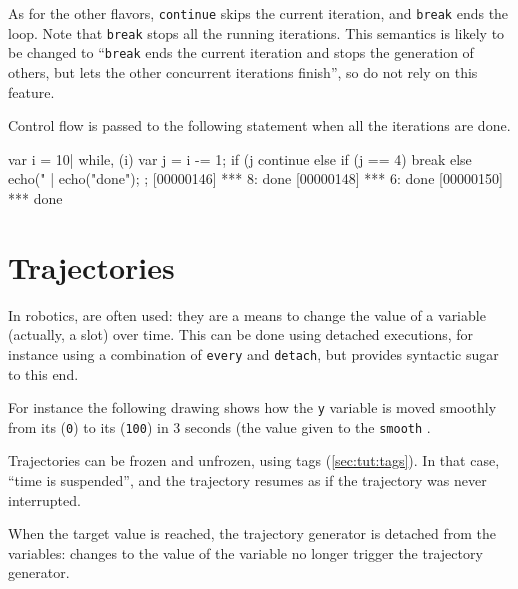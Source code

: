 As for the other flavors, \lstinline|continue| skips the current
iteration, and \lstinline|break| ends the loop.  Note that
\lstinline|break| stops all the running iterations.  This semantics is
likely to be changed to ``\lstinline|break| ends the current iteration
and stops the generation of others, but lets the other concurrent
iterations finish'', so do not rely on this feature.

Control flow is passed to the following statement when all the
iterations are done.

\begin{urbiscript}
{
  var i = 10|
  while, (i)
  {
    var j = i -= 1;
    if (j %
      continue
    else if (j == 4)
      break
    else
      echo("%
  }|
  echo("done");
};
[00000146] *** 8: done
[00000148] *** 6: done
[00000150] *** done
\end{urbiscript}



\section{Trajectories}
\label{sec:lang:traj}

In robotics,  are often used: they are a
means to change the value of a variable (actually, a slot) over time.
This can be done using detached executions, for instance using a
combination of \lstinline|every| and \lstinline|detach|, but \us
provides syntactic sugar to this end.

For instance the following drawing shows how the \lstinline|y|
variable is moved smoothly from its 
(\lstinline|0|) to its  (\lstinline|100|) in 3
seconds (the value given to the \lstinline|smooth| .


Trajectories can be frozen and unfrozen, using tags
(\autoref{sec:tut:tags}).  In that case, ``time is suspended'', and
the trajectory resumes as if the trajectory was never interrupted.


When the target value is reached, the trajectory generator is detached
from the variables: changes to the value of the variable no longer
trigger the trajectory generator.

